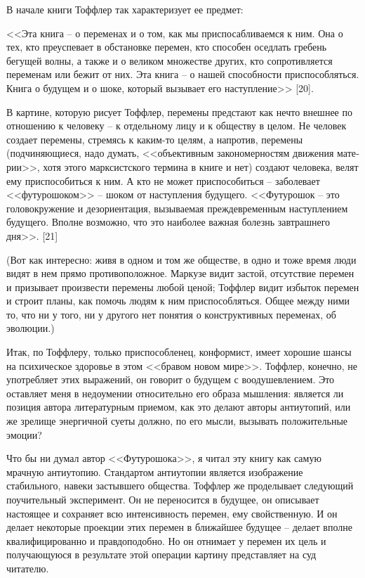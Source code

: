 \documentclass{book}
\begin{document}
В начале книги Тоффлер так характеризует ее предмет:

<<Эта книга -- о переменах и о том, как мы приспосабливаем­ся к ним. Она о тех, кто преуспевает в обстановке перемен, кто способен оседлать гребень бегущей волны, а также и о великом множестве других, кто сопротивляется переменам или бежит от них. Эта книга -- о нашей способности приспособляться. Книга о будущем и о шоке, который вызывает его наступле­ние>> [20].

В картине, которую рисует Тоффлер, перемены предстают как нечто внешнее по отношению к человеку -- к отдельному лицу и к обществу в целом. Не человек создает перемены, стре­мясь к каким-то целям, а напротив, перемены (подчиняющиеся, надо думать, <<объективным закономерностям движения мате­рии>>, хотя этого марксистского термина в книге и нет) созда­ют человека, велят ему приспособиться к ним. А кто не может приспособиться -- заболевает <<футурошоком>> -- шоком от на­ступления будущего. <<Футурошок -- это головокружение и де­зориентация, вызываемая преждевременным наступлением буду­щего. Вполне возможно, что это наиболее важная болезнь завт­рашнего дня>>. [21]

(Вот как интересно: живя в одном и том же обществе, в од­но и тоже время люди видят в нем прямо противоположное. Маркузе видит застой, отсутствие перемен и призывает произ­вести перемены любой ценой; Тоффлер видит избыток пере­мен и строит планы, как помочь людям к ним приспособлять­ся. Общее между ними то, что ни у того, ни у другого нет поня­тия о конструктивных  переменах, об эволюции.)

Итак, по Тоффлеру, только приспособленец, конформист, имеет хорошие шансы на психическое здоровье в этом <<бра­вом новом мире>>. Тоффлер, конечно, не употребляет этих вы­ражений, он говорит о будущем с воодушевлением. Это остав­ляет меня в недоумении относительно его образа мышления: является ли позиция автора литературным приемом, как это делают авторы антиутопий, или же зрелище энергичной суеты должно, по его мысли, вызывать положительные эмоции?

Что бы ни думал автор <<Футурошока>>, я читал эту книгу как самую мрачную антиутопию. Стандартом антиутопии являет­ся изображение стабильного, навеки застывшего общества. Тоффлер же проделывает следующий поучительный экспери­мент. Он не переносится в будущее, он описывает настоящее и сохраняет всю интенсивность перемен, ему свойственную. И он делает некоторые проекции этих перемен в ближайшее буду­щее -- делает вполне квалифицированно и правдоподобно. Но он отнимает у перемен их цель и получающуюся в результате этой операции картину представляет на суд читателю.
\end{document}
